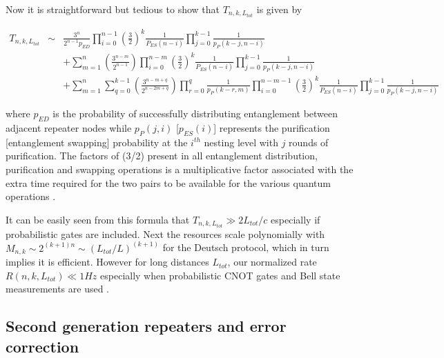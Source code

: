 \documentclass[twocolumn, aps, rmp, amsmath, amssymb, nofootinbib, superscriptaddress, longbibliography, floatfix, table-of-contents, eqsecnum]{revtex4-1}
\begin{document}
Now it is straightforward but tedious to show that $T_{n,k,L_{tot}}$ is given by \cite{braztzik2013}
\begin{widetext}
\begin{align*}
 T_{n,k,L_{tot}}&\sim&\frac{3^n}{2^{n-1} p_{ED}} \prod_{i=0}^{n-1} \left(\frac{3}{2}\right)^{k}  \frac{1}{P_{ES}(n-i)  }\prod_{j=0}^{k-1} \frac{1}{p_P(k-j,n-i)}  \nonumber \\
 &&+\sum_{m=1}^n\left(\frac{3^{n-m}}{2^{n-1}}\right) \prod_{i=0}^{n-m}   \left(\frac{3}{2}\right)^{k} \frac{1}{P_{ES}(n-i)}  \prod_{j=0}^{k-1}  \frac{1}{p_P(k-j,n-i)}  \\
&&+\sum_{m=1}^n {\sum_{q=0}^{k-1} \left(\frac{3^{n-m+q}}{2^{n- 2 m+q}}\right) \prod_{r=0}^{q}\frac{1}{p_P(k-r,m)}} 
\prod_{i=0}^{n-m-1}   \left(\frac{3}{2}\right)^{k} \frac{1}{P_{ES}(n-i)}  \prod_{j=0}^{k-1}  \frac{1}{p_P(k-j,n-i)} \nonumber 
 \end{align*}
\end{widetext}
where $p_{ED}$ is the probability of successfully distributing entanglement between adjacent repeater nodes while $p_P(j,i)$ [$p_{ES}(i)$] represents the purification [entanglement swapping] probability at the $i^{th}$ nesting level with $j$ rounds of purification.  The factors of (3/2) present in all entanglement distribution,  purification and swapping operations is a multiplicative factor associated with the extra time required for the two pairs to be available for the various quantum operations \cite{SSRG09}.


It can be easily seen from this formula that $ T_{n,k,L_{tot}} \gg 2 L_{tot} / c$ especially if probabilistic gates are included. Next the resources scale polynomially with  $M_{n,k}\sim 2^{(k+1)n}\sim (L_{tot}/L)^{(k+1)}$ for the Deutsch protocol, which in turn implies it is efficient. However for long distances $L_{tot}$, our normalized rate $R(n,k,L_{tot})\ll 1 Hz$ especially when probabilistic CNOT gates and Bell state measurements are used \cite{jiang09,munro10}.

\subsection{Second generation repeaters and error correction}
\end{document}
